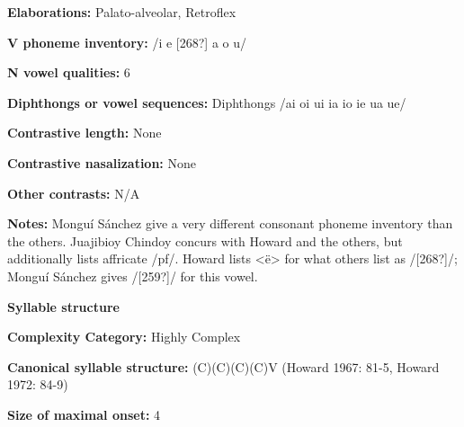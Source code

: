 \begin{styleBody}
\textbf{Elaborations:} Palato-alveolar, Retroflex
\end{styleBody}

\begin{styleBody}
\textbf{V phoneme inventory:} /i e [268?] a o u/
\end{styleBody}

\begin{styleBody}
\textbf{N vowel qualities:} 6
\end{styleBody}

\begin{styleBody}
\textbf{Diphthongs or vowel sequences:} Diphthongs /ai oi ui ia io ie ua ue/
\end{styleBody}

\begin{styleBody}
\textbf{Contrastive length:} None
\end{styleBody}

\begin{styleBody}
\textbf{Contrastive nasalization:} None
\end{styleBody}

\begin{styleBody}
\textbf{Other contrasts:} N/A
\end{styleBody}

\begin{styleBody}
\textbf{Notes:} Monguí Sánchez give a very different consonant phoneme inventory than the others. Juajibioy Chindoy concurs with Howard and the others, but additionally lists affricate /pf/. Howard lists {\textless}ë{\textgreater} for what others list as /[268?]/; Monguí Sánchez gives /[259?]/ for this vowel.
\end{styleBody}

\begin{styleBody}
\textbf{Syllable structure}
\end{styleBody}

\begin{styleBody}
\textbf{Complexity Category:} Highly Complex
\end{styleBody}

\begin{styleBody}
\textbf{Canonical syllable structure:} (C)(C)(C)(C)V\textbf{ }(Howard 1967: 81-5, Howard 1972: 84-9)
\end{styleBody}

\begin{styleBody}
\textbf{Size of maximal onset:} 4
\end{styleBody}

